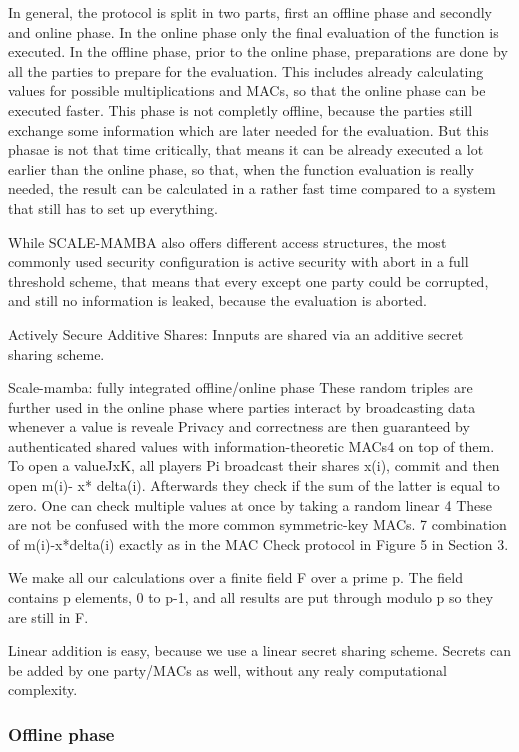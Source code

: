 \documentclass[english,runningheads,a4paper]{llncs}[2018/03/10]
\begin{document}
In general, the protocol is split in two parts, first an offline phase and secondly and online phase. In the online phase only the final evaluation of the function is executed. In the offline phase, prior to the online phase, preparations are done by all the parties to prepare for the evaluation. This includes already calculating values for possible multiplications and MACs, so that the online phase can be executed faster. This phase is not completly offline, because the parties still exchange some information which are later needed for the evaluation. But this phasae is not that time critically, that means it can be already executed a lot earlier than the online phase, so that, when the function evaluation is really needed, the result can be calculated in a rather fast time compared to a system that still has to set up everything.

While SCALE-MAMBA also offers different access structures, the most commonly used security configuration is active security with abort in a full threshold scheme, that means that every except one party could be corrupted, and still no information is leaked, because the evaluation is aborted.



Actively Secure
Additive Shares: Innputs are shared via an additive secret sharing scheme.

Scale-mamba: fully integrated offline/online phase
These random triples are further used in the online phase where parties interact by broadcasting data whenever a value is reveale
Privacy and correctness are then guaranteed by authenticated shared values with information-theoretic MACs4 on top of them.
To open a valueJxK, all players Pi broadcast their shares x(i), commit and then open m(i)- x* delta(i). Afterwards they check if the sum of the latter is equal to zero. One can check multiple values at once by taking a random linear 4 These are not be confused with the more common symmetric-key MACs.
7
combination of m(i)-x*delta(i) exactly as in the MAC Check protocol in Figure 5 in Section 3. 


We make all our calculations over a finite field F over a prime p. The field contains p elements, 0 to p-1, and all results are put through modulo p so they are still in F.

Linear addition is easy, because we use a linear secret sharing scheme. Secrets can be added by one party/MACs as well, without any realy computational complexity. 


\subsubsection{Offline phase}
\end{document}
